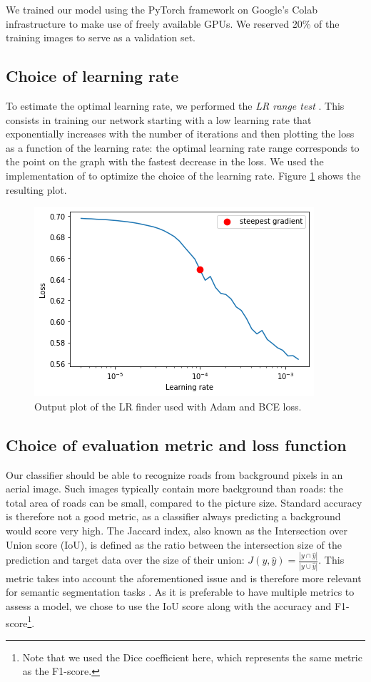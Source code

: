 \documentclass[10pt,conference,compsocconf]{IEEEtran}
\begin{document}
We trained our model using the PyTorch framework \cite{pytorch} on Google's Colab infrastructure to make use of freely available GPUs. We reserved 20\% of the training images to serve as a validation set. 

\subsection{Choice of learning rate}
\label{sec:choice_lr}

To estimate the optimal learning rate, we performed the \emph{LR range test}  \cite{lr_estimation}. This consists in training our network starting with a low learning rate that exponentially increases with the number of iterations and then plotting the loss as a function of the learning rate: the optimal learning rate range corresponds to the point on the graph with the fastest decrease in the loss. We used the implementation of \cite{pytorch_lr_finder} to optimize the choice of the learning rate. Figure \ref{fig:lr_finder_plot} shows the resulting plot.

\begin{figure}[ht]
    \centering
    \includegraphics[width=0.6\linewidth]{doc/images/lr_finder_plot.png}
    \caption{Output plot of the LR finder used with Adam and BCE loss.}
    \label{fig:lr_finder_plot}
\end{figure}

\subsection{Choice of evaluation metric and loss function}

Our classifier should be able to recognize roads from background pixels in an aerial image. Such images typically contain more background than roads: the total area of roads can be small, compared to the picture size. Standard accuracy is therefore not a good metric, as a classifier always predicting a background would score very high. The Jaccard index, also known as the Intersection over Union score (IoU), is defined as the ratio between the intersection size of the prediction and target data over the size of their union: $J(y, \hat{y}) = \frac{|y \cap \hat{y}|}{|y \cup \hat{y}|}$. This metric takes into account the aforementioned issue and is therefore more relevant for semantic segmentation tasks \cite{reitsam_2020}. As it is preferable to have multiple metrics to assess a model, we chose to use the IoU score along with the accuracy and F1-score\footnote{Note that we used the Dice coefficient here, which represents the same metric as the F1-score.}. \\
\end{document}

